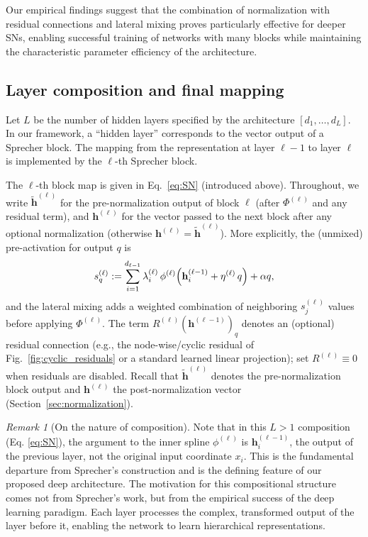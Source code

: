 \documentclass{article}
\theoremstyle{plain}
\theoremstyle{definition}
\theoremstyle{remark}
\newtheorem{remark}{Remark}
\begin{document}
Our empirical findings suggest that the combination of normalization with residual connections and lateral mixing proves particularly effective for deeper SNs, enabling successful training of networks with many blocks while maintaining the characteristic parameter efficiency of the architecture.

\subsection{Layer composition and final mapping}
Let $L$ be the number of hidden layers specified by the architecture $[d_1, \dots, d_L]$. In our framework, a ``hidden layer'' corresponds to the vector output of a Sprecher block. The mapping from the representation at layer $\ell-1$ to layer $\ell$ is implemented by the $\ell$-th Sprecher block.

The $\ell$-th block map is given in Eq.~\eqref{eq:SN} (introduced above). Throughout, we write $\tilde{\mathbf{h}}^{(\ell)}$ for the pre-normalization output of block $\ell$ (after $\Phi^{(\ell)}$ and any residual term), and $\mathbf{h}^{(\ell)}$ for the vector passed to the next block after any optional normalization (otherwise $\mathbf{h}^{(\ell)}=\tilde{\mathbf{h}}^{(\ell)}$). More explicitly, the (unmixed) pre-activation for output $q$ is
$$s_q^{(\ell)} := \sum_{i=1}^{d_{\ell-1}} \lambda^{(\ell)}_{i}\,\phi^{(\ell)}\Bigl(\mathbf{h}^{(\ell-1)}_i+\eta^{(\ell)}\,q\Bigr) + \alpha q,$$
and the lateral mixing adds a weighted combination of neighboring $s_j^{(\ell)}$ values before applying $\Phi^{(\ell)}$. The term $R^{(\ell)}(\mathbf{h}^{(\ell-1)})_q$ denotes an (optional) residual connection (e.g., the node-wise/cyclic residual of Fig.~\ref{fig:cyclic_residuals} or a standard learned linear projection); set $R^{(\ell)}\equiv 0$ when residuals are disabled. Recall that $\tilde{\mathbf{h}}^{(\ell)}$ denotes the pre-normalization block output and $\mathbf{h}^{(\ell)}$ the post-normalization vector (Section~\ref{sec:normalization}).

\begin{remark}[On the nature of composition]
Note that in this $L>1$ composition (Eq. \ref{eq:SN}), the argument to the inner spline $\phi^{(\ell)}$ is $\mathbf{h}^{(\ell-1)}_i$, the output of the previous layer, not the original input coordinate $x_i$. This is the fundamental departure from Sprecher's construction and is the defining feature of our proposed deep architecture. The motivation for this compositional structure comes not from Sprecher's work, but from the empirical success of the deep learning paradigm. Each layer processes the complex, transformed output of the layer before it, enabling the network to learn hierarchical representations.
\end{remark}
\end{document}

